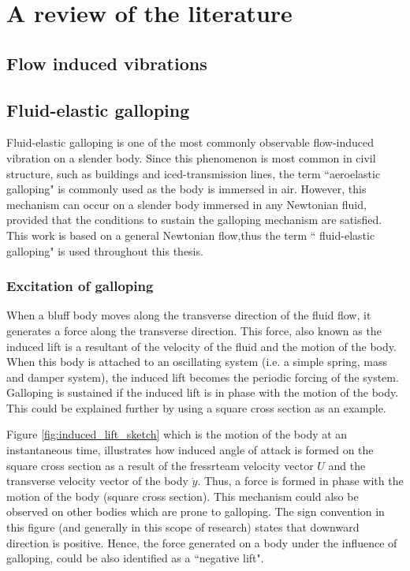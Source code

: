 \chapter{A review of the literature}

\section{Flow induced vibrations}


\section{Fluid-elastic galloping}

Fluid-elastic galloping is one of the most commonly observable flow-induced vibration on a slender body. Since this phenomenon is most common in civil structure, such as buildings and iced-transmission lines, the term ``aeroelastic galloping" is commonly used as the body is immersed in air. However, this mechanism can occur on a slender body immersed in any Newtonian fluid, provided that the conditions to sustain the galloping mechanism are satisfied. This work is based on a general Newtonian flow,thus the term `` fluid-elastic galloping" is used throughout this thesis.
   

\subsection{Excitation of galloping}

When a bluff body moves along the transverse direction of the fluid flow, it generates a force along the transverse direction. This force, also known as the induced lift is a resultant of the velocity of the fluid and the motion of the body. When this body is attached to an oscillating system (i.e. a simple spring, mass and damper system), the induced lift becomes the periodic forcing of the system. Galloping is sustained  if the induced lift is in phase with the motion of the body. This could be explained further by using a square cross section as an example.



 Figure \ref{fig:induced_lift_sketch}  which is the motion of the body at an instantaneous time, illustrates how induced angle of attack is formed on the square cross section as a result of the fressrteam velocity vector $U$ and the transverse velocity vector of the body $\dot{y}$. Thus, a force is formed in phase with the motion of the body (square cross section). This mechanism could also be observed on other bodies which are prone to galloping. The sign convention in this figure (and generally in this scope of research) states that downward direction is positive. Hence, the force generated on a body under the influence of galloping, could be also identified as a ``negative lift".



